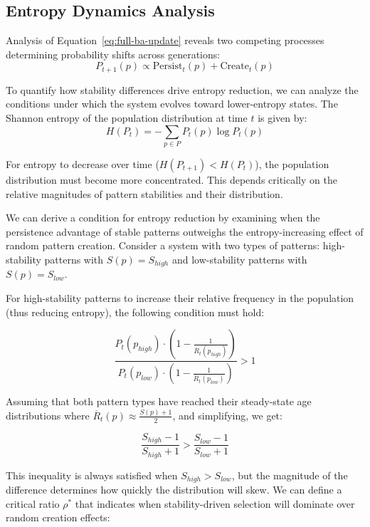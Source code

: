 \documentclass[preprint,12pt]{elsarticle}
\begin{document}
\subsection{Entropy Dynamics Analysis}

Analysis of Equation~\ref{eq:full-ba-update} reveals two competing processes determining probability shifts across generations:
\begin{equation}
P_{t+1}(p) \propto \mathrm{Persist}_t(p) + \mathrm{Create}_t(p)
\end{equation}

To quantify how stability differences drive entropy reduction, we can analyze the conditions under which the system evolves toward lower-entropy states. The Shannon entropy of the population distribution at time $t$ is given by:
\begin{equation}
H(P_t) = -\sum_{p \in P} P_t(p) \log P_t(p)
\end{equation}

For entropy to decrease over time ($H(P_{t+1}) < H(P_t)$), the population distribution must become more concentrated. This depends critically on the relative magnitudes of pattern stabilities and their distribution.

We can derive a condition for entropy reduction by examining when the persistence advantage of stable patterns outweighs the entropy-increasing effect of random pattern creation. Consider a system with two types of patterns: high-stability patterns with $S(p) = S_{high}$ and low-stability patterns with $S(p) = S_{low}$.

For high-stability patterns to increase their relative frequency in the population (thus reducing entropy), the following condition must hold:

\begin{equation}
\frac{P_t(p_{high}) \cdot (1 - \frac{1}{\overline{R}_t(p_{high})})}{P_t(p_{low}) \cdot (1 - \frac{1}{\overline{R}_t(p_{low})})} > 1
\end{equation}

Assuming that both pattern types have reached their steady-state age distributions where $\overline{R}_t(p) \approx \frac{S(p)+1}{2}$, and simplifying, we get:

\begin{equation}
\frac{S_{high} - 1}{S_{high} + 1} > \frac{S_{low} - 1}{S_{low} + 1}
\end{equation}

This inequality is always satisfied when $S_{high} > S_{low}$, but the magnitude of the difference determines how quickly the distribution will skew. We can define a critical ratio $\rho^*$ that indicates when stability-driven selection will dominate over random creation effects:
\end{document}
